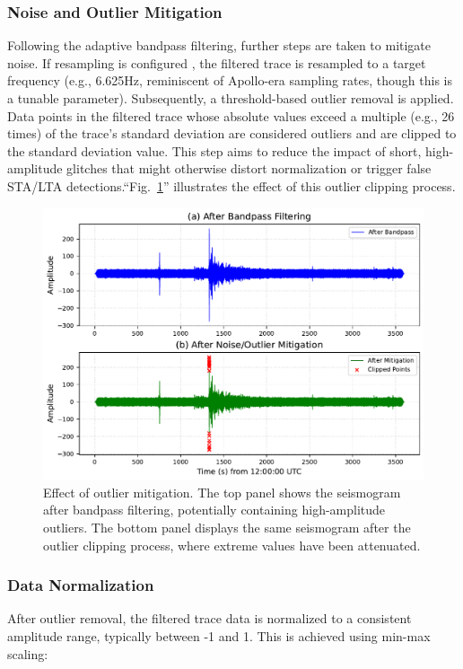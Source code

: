 \documentclass[conference]{IEEEtran}
\begin{document}
        \subsubsection{Noise and Outlier Mitigation}
            Following the adaptive bandpass filtering, further steps are taken to mitigate noise. If resampling is
            configured , the filtered trace is resampled to a target frequency (e.g., 6.625Hz, reminiscent of Apollo-era
            sampling rates, though this is a tunable parameter). Subsequently, a threshold-based outlier removal is applied.
            Data points in the filtered trace whose absolute values exceed a multiple (e.g., 26 times) of the trace's
            standard deviation are considered outliers and are clipped to the standard deviation value. This step aims to
            reduce the impact of short, high-amplitude glitches that might otherwise distort normalization or trigger false
            STA/LTA detections.``Fig.~\ref{fig:outlier_clipping_comparison}'' illustrates the effect of this outlier clipping process.

        \begin{figure}[htbp]
            \centerline{\includegraphics[width=0.9\columnwidth]{figures/fig3_mitigation.pdf}}
            \caption{Effect of outlier mitigation. The top panel shows the seismogram after bandpass filtering, 
            potentially containing high-amplitude outliers. The bottom panel displays the same seismogram after 
            the outlier clipping process, where extreme values have been attenuated.}
            \label{fig:outlier_clipping_comparison}
        \end{figure}

        \subsubsection{Data Normalization}
            After outlier removal, the filtered trace data is normalized to a consistent amplitude range,
            typically between -1 and 1. This is achieved using min-max scaling:
            
\end{document}
